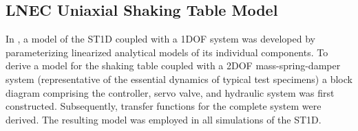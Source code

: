 \documentclass[ 10pt, twocolumn]{article} %
\begin{document}
\subsection{LNEC Uniaxial Shaking Table Model}

In \citet{tekeste2021}, a model of the ST1D coupled with a 1DOF system was developed by parameterizing linearized analytical models of its individual components. To derive a model for the shaking table coupled with a 2DOF mass-spring-damper system (representative of the essential dynamics of typical test specimens) a block diagram comprising the controller, servo valve, and hydraulic system was first constructed. Subsequently, transfer functions for the complete system were derived. The resulting model was employed in all simulations of the ST1D.








\end{document}
